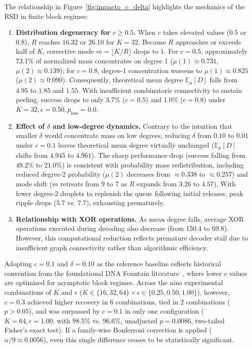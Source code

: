 The relationship in Figure~\ref{fig:impacto_c_delta} highlights the mechanics of the RSD in finite block regimes:
\begin{enumerate}
    \item \textbf{Distribution degeneracy for $c \ge 0.5$.} When $c$ takes elevated values ($0.5$ or $0.8$), $R$ reaches $16.32$ or $26.10$ for $K = 32$. Because $R$ approaches or exceeds half of $K$, corrective mode $m = \lfloor K/R \rfloor$ drops to $1$. For $c = 0.5$, approximately 73.1\% of normalized mass concentrates on degree 1 ($\mu(1) \approx 0.731$, $\mu(2) \approx 0.139$); for $c = 0.8$, degree-1 concentration worsens to $\mu(1) \approx 0.825$ ($\mu(2) \approx 0.090$). Consequently, theoretical mean degree $\mathbb{E}_\mu[D]$ falls from $4.95$ to $1.85$ and $1.55$. With insufficient combinatoric connectivity to sustain peeling, success drops to only 3.7\% ($c=0.5$) and 1.0\% ($c=0.8$) under $K=32, \epsilon=0.50, p_{\text{loss}}=0.0$.
    
    \item \textbf{Effect of $\delta$ and low-degree dynamics.} Contrary to the intuition that smaller $\delta$ would concentrate mass on low degrees, reducing $\delta$ from $0.10$ to $0.01$ under $c = 0.1$ leaves theoretical mean degree virtually unchanged ($\mathbb{E}_\mu[D]$ shifts from $4.945$ to $4.961$). The sharp performance drop (success falling from $49.2\%$ to $21.0\%$) is consistent with probability mass redistribution, including reduced degree-2 probability ($\mu(2)$ decreases from $\approx 0.338$ to $\approx 0.257$) and mode shift ($m$ retreats from $9$ to $7$ as $R$ expands from $3.26$ to $4.57$). With fewer degree-2 droplets to replenish the queue following initial releases, peak ripple drops ($5.7$ vs. $7.7$), exhausting prematurely.
    
    \item \textbf{Relationship with XOR operations.} As mean degree falls, average XOR operations executed during decoding also decrease (from 150.4 to 69.8). However, this computational reduction reflects premature decoder stall due to insufficient graph connectivity rather than algorithmic efficiency.
\end{enumerate}

Adopting $c = 0.1$ and $\delta = 0.10$ as the reference baseline reflects historical convention from the foundational DNA Fountain literature~\cite{erlich2017}, where lower $c$ values are optimized for asymptotic block regimes. Across the nine experimental combinations of $K$ and $\epsilon$ ($K \in \{16, 32, 64\} \times \epsilon \in \{0.25, 0.50, 1.00\}$), however, $c = 0.3$ achieved higher recovery in 6 combinations, tied in 2 combinations ($p > 0.05$), and was surpassed by $c = 0.1$ in only one configuration ($K = 64, \epsilon = 1.00$, with $98.5\%$ vs. $96.6\%$, unadjusted $p = 0.0086$, two-tailed Fisher's exact test). If a family-wise Bonferroni correction is applied ($\alpha/9 \approx 0.0056$), even this single difference ceases to be statistically significant.


